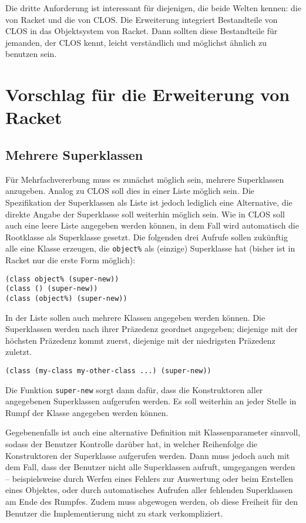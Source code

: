 Die dritte Anforderung ist interessant für diejenigen, die beide Welten kennen: die von Racket und die von CLOS. Die Erweiterung integriert Bestandteile von CLOS in das Objektsystem von Racket. Dann sollten diese Bestandteile für jemanden, der CLOS kennt, leicht verständlich und möglichst ähnlich zu benutzen sein.

\section{Vorschlag für die Erweiterung von Racket}

\subsection{Mehrere Superklassen}
Für Mehrfachvererbung muss es zunächst möglich sein, mehrere Superklassen anzugeben. Analog zu CLOS soll dies in einer Liste möglich sein. Die Spezifikation der Superklassen als Liste ist jedoch lediglich eine Alternative, die direkte Angabe der Superklasse soll weiterhin möglich sein. Wie in CLOS soll auch eine leere Liste angegeben werden können, in dem Fall wird automatisch die Rootklasse als Superklasse gesetzt. Die folgenden drei Aufrufe sollen zukünftig alle eine Klasse erzeugen, die \texttt{object\%} als (einzige) Superklasse hat (bisher ist in Racket nur die erste Form möglich):

\begin{lstlisting}
(class object% (super-new))
(class () (super-new))
(class (object%) (super-new))
\end{lstlisting}

In der Liste sollen auch mehrere Klassen angegeben werden können. Die Superklassen werden nach ihrer Präzedenz geordnet angegeben; diejenige mit der höchsten Präzedenz kommt zuerst, diejenige mit der niedrigsten Präzedenz zuletzt. 

\begin{lstlisting}
(class (my-class my-other-class ...) (super-new)) 
\end{lstlisting}

Die Funktion \texttt{super-new} sorgt dann dafür, dass die Konstruktoren aller angegebenen  Superklassen aufgerufen werden. Es soll weiterhin an jeder Stelle in Rumpf der Klasse angegeben werden können. 

Gegebenenfalls ist auch eine alternative Definition mit Klassenparameter sinnvoll, sodass der Benutzer Kontrolle darüber hat, in welcher Reihenfolge die Konstruktoren der Superklasse aufgerufen werden. Dann muss jedoch auch mit dem Fall, dass der Benutzer nicht alle Superklassen aufruft, umgegangen werden -- beispielsweise durch Werfen eines Fehlers zur Auswertung oder beim Erstellen eines Objektes, oder durch automatisches Aufrufen aller fehlenden Superklassen am Ende des Rumpfes. Zudem muss abgewogen werden, ob diese Freiheit für den Benutzer die Implementierung nicht zu stark verkompliziert.


